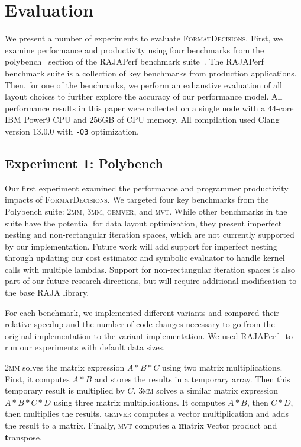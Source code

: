 \documentclass[sigconf,review=true]{acmart}
\newcommand{\FormatDecisions}[0]{{\textsc{FormatDecisions}}}
\begin{document}
\section{Evaluation}
\label{sec:eval}

We present a number of experiments to evaluate \FormatDecisions. 
First, we examine performance and productivity using four benchmarks from the polybench~\cite{pouchet2012polybench} section of the RAJAPerf benchmark suite~\cite{hornung2017raja}.
The RAJAPerf benchmark suite is a collection of key benchmarks from production applications.
Then, for one of the benchmarks, we perform an exhaustive evaluation of all layout choices to further explore the accuracy of our performance model.
All performance results in this paper were collected on a single node with a 44-core IBM Power9 CPU and 256GB of CPU memory.
All compilation used Clang version 13.0.0 with \verb.-O3. optimization.

\subsection{Experiment 1: Polybench}
\label{sec:Experiment1}
Our first experiment examined the performance and programmer productivity impacts of \FormatDecisions{}.
We targeted four key benchmarks from the Polybench suite: \textsc{2mm}, \textsc{3mm}, \textsc{gemver}, and \textsc{mvt}.
While other benchmarks in the suite have the potential for data layout optimization, they present imperfect nesting and non-rectangular iteration spaces, which are not currently supported by our implementation. 
Future work will add support for imperfect nesting through updating our cost estimator and symbolic evaluator to handle kernel calls with multiple lambdas. 
Support for non-rectangular iteration spaces is also part of our future research directions, but will require additional modification to the base RAJA library.

For each benchmark, we implemented different variants and compared their relative speedup and the number of code changes necessary to go from the original implementation to the variant implementation.
We used RAJAPerf~\cite{hornung2017raja} to run our experiments with default data sizes.


\textsc{2mm} solves the matrix expression $A*B*C$ using two matrix multiplications. 
First, it computes $A*B$ and stores the results in a temporary array.
Then this temporary result is multiplied by $C$.
\textsc{3mm} solves a similar matrix expression $A*B*C*D$ using three matrix multiplications.
It computes $A*B$, then $C*D$, then multiplies the results.
\textsc{gemver} computes a vector multiplication and adds the result to a matrix. 
Finally, \textsc{mvt} computes a \textbf{m}atrix \textbf{v}ector product and \textbf{t}ranspose.
\end{document}
